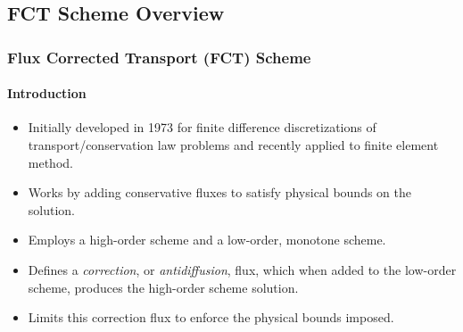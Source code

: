 \documentclass{beamer}
\begin{document}
\subsection{FCT Scheme Overview}
\begin{frame}
\frametitle{Flux Corrected Transport (FCT) Scheme}
\framesubtitle{Introduction}

\begin{itemize}
   \item Initially developed in 1973 for finite difference discretizations of
      transport/conservation law problems and recently applied to finite element
      method.
   \item Works by adding conservative fluxes to satisfy physical bounds on the
      solution.
   \item Employs a high-order scheme and a low-order, monotone scheme.
   \item Defines a \emph{correction}, or \emph{antidiffusion}, flux, which
      when added to the low-order scheme, produces the high-order scheme
      solution.
   \item Limits this correction flux to enforce the physical bounds imposed.
\end{itemize}

\end{frame}
\end{document}
